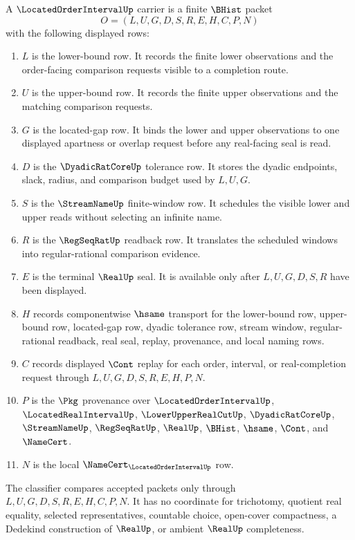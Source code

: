 \begin{definition}
\label{def:located-order-interval-carrier}
A $\LocatedOrderIntervalUp$ carrier is a finite $\BHist$ packet
$$
O=(L,U,G,D,S,R,E,H,C,P,N)
$$
with the following displayed rows:
\begin{enumerate}
\item $L$ is the lower-bound row. It records the finite lower observations and the order-facing comparison requests visible to a completion route.
\item $U$ is the upper-bound row. It records the finite upper observations and the matching comparison requests.
\item $G$ is the located-gap row. It binds the lower and upper observations to one displayed apartness or overlap request before any real-facing seal is read.
\item $D$ is the $\DyadicRatCoreUp$ tolerance row. It stores the dyadic endpoints, slack, radius, and comparison budget used by $L,U,G$.
\item $S$ is the $\StreamNameUp$ finite-window row. It schedules the visible lower and upper reads without selecting an infinite name.
\item $R$ is the $\RegSeqRatUp$ readback row. It translates the scheduled windows into regular-rational comparison evidence.
\item $E$ is the terminal $\RealUp$ seal. It is available only after $L,U,G,D,S,R$ have been displayed.
\item $H$ records componentwise $\hsame$ transport for the lower-bound row, upper-bound row, located-gap row, dyadic tolerance row, stream window, regular-rational readback, real seal, replay, provenance, and local naming rows.
\item $C$ records displayed $\Cont$ replay for each order, interval, or real-completion request through $L,U,G,D,S,R,E,H,P,N$.
\item $P$ is the $\Pkg$ provenance over $\LocatedOrderIntervalUp$, $\LocatedRealIntervalUp$, $\LowerUpperRealCutUp$, $\DyadicRatCoreUp$, $\StreamNameUp$, $\RegSeqRatUp$, $\RealUp$, $\BHist$, $\hsame$, $\Cont$, and $\NameCert$.
\item $N$ is the local $\NameCert_{\LocatedOrderIntervalUp}$ row.
\end{enumerate}
The classifier compares accepted packets only through $L,U,G,D,S,R,E,H,C,P,N$. It has no coordinate for trichotomy, quotient real equality, selected representatives, countable choice, open-cover compactness, a Dedekind construction of $\RealUp$, or ambient $\RealUp$ completeness.
\end{definition}

